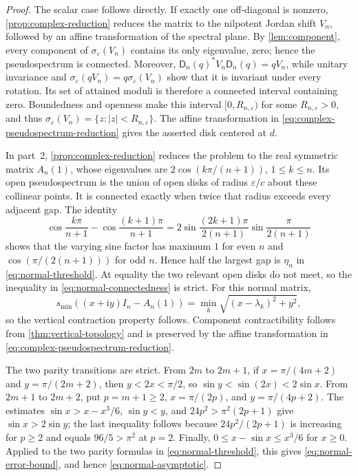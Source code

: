 \documentclass[10pt,twoside]{siamart1116}
\numberwithin{equation}{section}
\newcommand{\ii}{\mathrm i}
\begin{document}
\begin{proof}
The scalar case follows directly.  If exactly one off-diagonal is nonzero,
\cref{prop:complex-reduction} reduces the matrix to the nilpotent Jordan
shift \(V_n\), followed by an affine transformation of the spectral plane.
By \cref{lem:component}, every
component of \(\sigma_\varepsilon(V_n)\) contains its only eigenvalue, zero;
hence the pseudospectrum is connected.  Moreover,
\(\mathsf D_n(q)^*V_n\mathsf D_n(q)=qV_n\), while unitary invariance and
\(\sigma_\varepsilon(qV_n)=q\sigma_\varepsilon(V_n)\) show that it is
invariant under every rotation.  Its
set of attained moduli is therefore a connected interval containing zero.
Boundedness and openness make this interval \([0,R_{n,\varepsilon})\) for
some \(R_{n,\varepsilon}>0\), and thus
\(\sigma_\varepsilon(V_n)=\{z:|z|<R_{n,\varepsilon}\}\).  The affine
transformation in \eqref{eq:complex-pseudospectrum-reduction} gives the
asserted disk centered at \(d\).

In part~2, \cref{prop:complex-reduction} reduces the problem to the real
symmetric matrix \(A_n(1)\), whose eigenvalues are
\(2\cos(k\pi/(n+1))\), \(1\leq k\leq n\).  Its open pseudospectrum is the
union of open disks of radius \(\varepsilon/c\) about these collinear
points.  It is connected exactly when twice that radius exceeds every
adjacent gap.  The identity
\[
 \cos\frac{k\pi}{n+1}-\cos\frac{(k+1)\pi}{n+1}
 =2\sin\frac{(2k+1)\pi}{2(n+1)}
   \sin\frac{\pi}{2(n+1)}
\]
shows that the varying sine factor has maximum \(1\) for even \(n\) and
\(\cos(\pi/(2(n+1)))\) for odd \(n\).  Hence half the largest gap is
\(\eta_n\) in
\eqref{eq:normal-threshold}.  At equality the two relevant open disks do
not meet, so the inequality in \eqref{eq:normal-connectedness} is strict.
For this normal matrix,
\[
 s_{\min}((x+\ii y)I_n-A_n(1))
 =\min_k\sqrt{(x-\lambda_k)^2+y^2},
\]
so the vertical contraction property follows.  Component
contractibility follows from \cref{thm:vertical-topology} and is preserved by
the affine transformation in \eqref{eq:complex-pseudospectrum-reduction}.

The two parity transitions are strict.  From \(2m\) to
\(2m+1\), if \(x=\pi/(4m+2)\) and \(y=\pi/(2m+2)\), then
\(y<2x<\pi/2\), so \(\sin y<\sin(2x)<2\sin x\).  From \(2m+1\) to
\(2m+2\), put \(p=m+1\geq2\), \(x=\pi/(2p)\), and
\(y=\pi/(4p+2)\).  The estimates
\(\sin x>x-x^3/6\), \(\sin y<y\), and
\(24p^2>\pi^2(2p+1)\) give \(\sin x>2\sin y\); the last inequality follows
because \(24p^2/(2p+1)\) is increasing for \(p\geq2\) and equals
\(96/5>\pi^2\) at \(p=2\).
Finally, \(0\leq x-\sin x\leq x^3/6\) for \(x\geq0\).  Applied to the two
parity formulas in \eqref{eq:normal-threshold}, this gives
\eqref{eq:normal-error-bound}, and hence \eqref{eq:normal-asymptotic}.
\end{proof}
\end{document}
